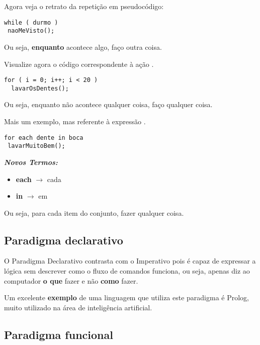 Agora veja o retrato da repetição  em pseudocódigo:

\begin{lstlisting}
while ( durmo )        
 naoMeVisto();       
\end{lstlisting}

Ou seja, \textbf{enquanto} acontece algo, faço outra coisa. 

Visualize agora o código correspondente à ação .

\begin{lstlisting}
for ( i = 0; i++; i < 20 )        
  lavarOsDentes();      
\end{lstlisting}

Ou seja, enquanto não acontece qualquer coisa, faço qualquer coisa.

Mais um exemplo, mas referente à expressão .

\begin{lstlisting}
for each dente in boca        
 lavarMuitoBem();    
\end{lstlisting}

\textit{\textbf{Novos Termos:}}

\begin{itemize}
\item \textbf{each} \(\rightarrow\) cada
\item \textbf{in} \(\rightarrow\) em
\end{itemize}

Ou seja, para cada item do conjunto, fazer qualquer coisa.

\subsection{Paradigma declarativo}

O Paradigma Declarativo contrasta com o Imperativo pois é capaz de expressar a lógica sem descrever como o fluxo de comandos funciona, ou seja, apenas diz ao computador \textbf{o que} fazer e não \textbf{como} fazer. 

Um excelente \textbf{exemplo} de uma linguagem que utiliza este paradigma é Prolog, muito utilizado na área de inteligência artificial.

\subsection{Paradigma funcional}

